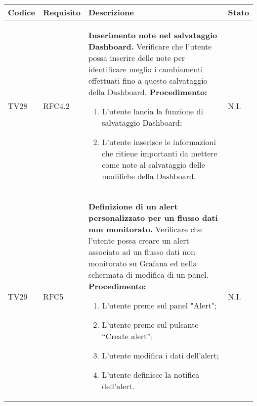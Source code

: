 \begin{table}[!htpb]
	\centering
	\renewcommand{\arraystretch}{2} 
	\begin{tabular}{|l|l|p{10cm}|l|}
		\rowcolor{orange!50}
		\hline
		\textbf{Codice} & \textbf{Requisito}& \textbf{Descrizione} & \textbf{Stato}\\ 
		\hline
		TV28 & RFC4.2 &
			\textbf{Inserimento note nel salvataggio Dashboard.}
			\newline
			Verificare che l'utente possa inserire delle note per identificare meglio i cambiamenti effettuati fino a questo salvataggio della Dashboard.
			\newline
			\textbf{Procedimento:}
			\begin{enumerate}
				\item L'utente lancia la funzione di salvataggio Dashboard; 
				\item L’utente inserisce le informazioni che ritiene importanti da mettere come note al salvataggio delle modifiche della Dashboard.
			\end{enumerate} 
			& N.I.\\
		\hline
		TV29 & RFC5 &
			\textbf{Definizione di un alert personalizzato per un flusso dati non monitorato.} 
			\newline
			Verificare che l’utente possa creare un alert associato ad un flusso dati non monitorato su Grafana ed nella schermata di modifica di un panel. 
			\newline 
			\textbf{Procedimento:} 
			\begin{enumerate} 
				\item L'utente preme sul panel "Alert"; 
				\item L’utente preme sul pulsante “Create alert”; 
				\item L'utente modifica i dati dell'alert; 
				\item L'utente definisce la notifica dell'alert.		
			\end{enumerate} 
			& N.I.\\
		\hline
	\end{tabular}
\end{table}
